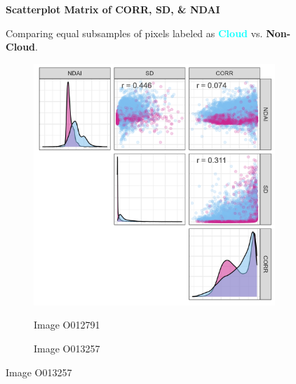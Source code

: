 \documentclass[10pt,letterpaper]{article}
\begin{document}
\begin{figure}[ht]
    \centering

    \parbox{\textwidth}{\centering 
        \fontsize{13pt}{13pt}\selectfont \textbf{Scatterplot Matrix of CORR, SD, \& NDAI}  
        
        {\fontsize{11pt}{13pt}\selectfont Comparing equal subsamples of pixels labeled as \textcolor{Cyan}{\textbf{Cloud}} vs. \textcolor{RedViolet}{\textbf{Non-Cloud}}.} 
    }

    \begin{subfigure}[t]{0.3\textwidth}
        \centering
        \caption{Image O012791}
        \includegraphics[width=\textwidth]{figs/corr41_void.png}
        \label{subfig:corr41}
    \end{subfigure}
    \hfill
    \begin{subfigure}[t]{0.3\textwidth}
        \centering
        \caption{Image O013257}

\end{subfigure}
\end{figure}
\end{document}

